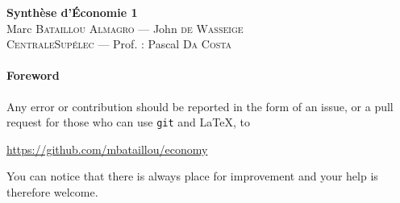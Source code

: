 \documentclass[12pt,oneside,a4paper]{article}
\begin{document}
\begin{center}
{\LARGE \bfseries 
  Synthèse d'Économie 1 \\[0.3cm] 
}
{\large
  Marc \textsc{Bataillou Almagro} --- John \textsc{de Wasseige}\\[0.3cm]
}
{\normalsize
  \textsc{CentraleSupélec} --- Prof. : Pascal \textsc{Da Costa} \\[0.9cm]
}
\end{center}

\paragraph{Foreword}
Any error or contribution should be reported
in the form of an issue, or a pull request for those
who can use \texttt{git} and \LaTeX, to
\begin{center}
  \url{https://github.com/mbataillou/economy}
\end{center}
You can notice that there is always place for improvement
and your help is therefore welcome.
\vspace{\baselineskip}
  
{\hypersetup{linkcolor=black}
\tableofcontents}\newpage

\newpage

\end{document}
